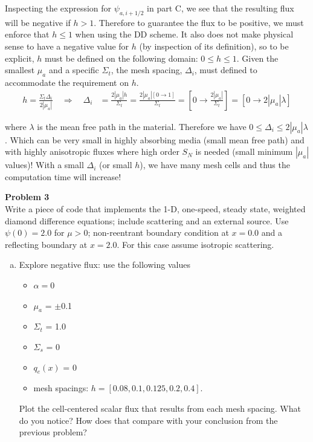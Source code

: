 \documentclass[10pt]{article}
\begin{document}
Inspecting the expression for $\psi_{a,i+1/2}$ in part C, we see that the resulting flux will be negative if $h>1$. Therefore to guarantee the flux to be positive, we must enforce that $h\leq1$ when using the DD scheme. It also does not make physical sense to have a negative value for $h$ (by inspection of its definition), so to be explicit, $h$ must be defined on the following domain: $0\leq h \leq 1$. Given the smallest $\mu_a$ and a specific $\Sigma_t$, the mesh spacing, $\Delta_i$, must defined to accommodate the requirement on $h$.
%
\begin{align*}
    h=\frac{\Sigma_t \Delta_i}{2|\mu_a|} \quad \Rightarrow \quad \Delta_i &= \frac{2|\mu_a| h}{\Sigma_t} = \frac{2|\mu_a| [0\rightarrow1]}{\Sigma_t} = [0 \rightarrow \frac{2|\mu_a|}{\Sigma_t}] = [0 \rightarrow 2|\mu_a| \lambda]
\end{align*}

where $\lambda$ is the mean free path in the material. Therefore we have $0 \leq \Delta_i \leq 2|\mu_a|\lambda$. Which can be very small in highly absorbing media (small mean free path) and with highly anisotropic fluxes where high order $S_N$ is needed (small minimum $|\mu_a|$ values)! With a small $\Delta_i$ (or small $h$), we have many mesh cells and thus the computation time will increase!









\newpage
\noindent \textbf{Problem 3}\\
Write a piece of code that implements the 1-D, one-speed, steady state, weighted diamond difference equations; include scattering and an external source. Use $\psi(0) = 2.0$ for $\mu > 0$; non-reentrant boundary condition at $x=0.0$ and a reflecting boundary at $x=2.0$. For this case assume isotropic scattering.

\begin{enumerate}[(a)]
\item Explore negative flux: use the following values
\begin{itemize}
\setlength\itemsep{0em}
\item $\alpha = 0$
\item $\mu_a$ = $\pm$0.1
\item $\Sigma_t$ = 1.0
\item $\Sigma_s$ = 0
\item $q_e(x)$ = 0
\item mesh spacings: $h = [0.08, 0.1, 0.125, 0.2, 0.4]$.
\end{itemize}
Plot the cell-centered scalar flux that results from each mesh spacing. What do you notice? How does that compare with your conclusion from the previous problem?
\end{enumerate}
\end{document}
